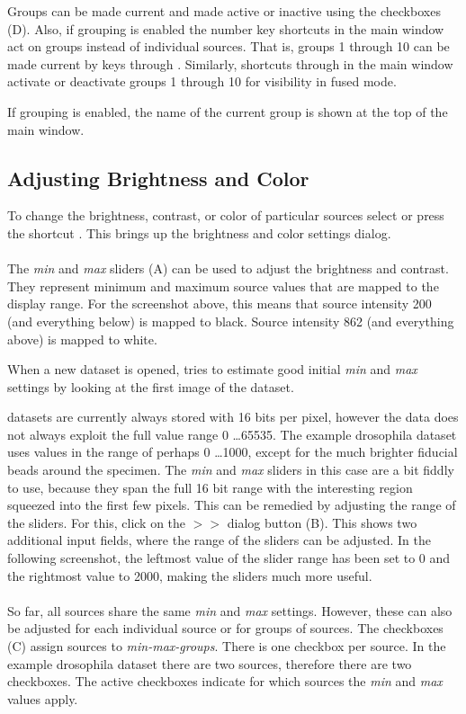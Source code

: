 \documentclass{scrartcl}
\begin{document}
Groups can be made current and made active or inactive using the checkboxes (D).
Also, if grouping is enabled the number key shortcuts in the main \bdv window act on groups instead of individual sources.
That is, groups 1 through 10 can be made current by keys  through .
Similarly, shortcuts  through  in the main window activate or deactivate groups 1 through 10 for visibility in fused mode.

If grouping is enabled, the name of the current group is shown at the top of the main window.
\\

%
\subsection{Adjusting Brightness and Color}
To change the brightness, contrast, or color of particular sources select  or press the shortcut .
This brings up the brightness and color settings dialog.
\\
\\
The \emph{min} and \emph{max} sliders (A) can be used to adjust the brightness and contrast.
They represent minimum and maximum source values that are mapped to the display range.
For the screenshot above, this means that source intensity 200 (and everything below) is mapped to black. Source intensity 862 (and everything above) is mapped to white.

When a new dataset is opened, \Bdv tries to estimate good initial \emph{min} and \emph{max} settings by looking at the first image of the dataset.

\Bdv datasets are currently always stored with 16 bits per pixel, however the data does not always exploit the full value range 0 \dots 65535.
The example drosophila dataset uses values in the range of perhaps 0 \dots 1000, except for the much brighter fiducial beads around the specimen.
The \emph{min} and \emph{max} sliders in this case are a bit fiddly to use, because they span the full 16 bit range with the interesting region squeezed into the first few pixels.
This can be remedied by adjusting the range of the sliders.
For this, click on the $>>$ dialog button (B).
This shows two additional input fields, where the range of the sliders can be adjusted.
In the following screenshot, the leftmost value of the slider range has been set to 0 and the rightmost value to 2000, making the sliders much more useful.
\\
\\
So far, all sources share the same \emph{min} and \emph{max} settings.
However, these can also be adjusted for each individual source or for groups of sources.
The checkboxes (C) assign sources to \emph{min-max-groups}.
There is one checkbox per source.
In the example drosophila dataset there are two sources, therefore there are two checkboxes.
The active checkboxes indicate for which sources the \emph{min} and \emph{max} values apply.
\end{document}
